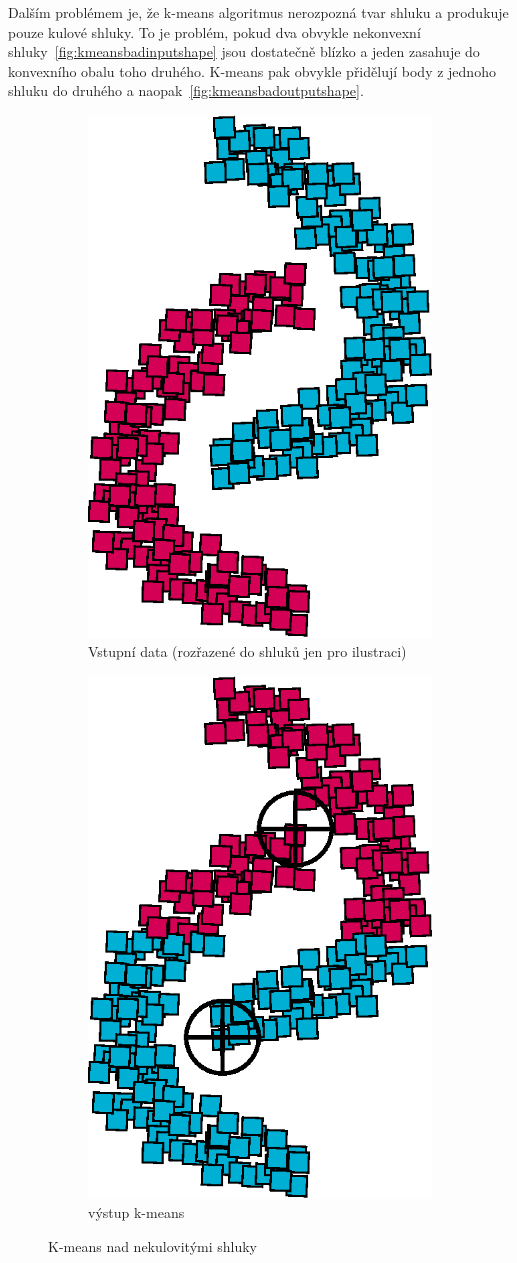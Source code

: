Dalším problémem je, že k-means algoritmus nerozpozná tvar shluku a produkuje pouze kulové shluky. To je problém, pokud dva obvykle nekonvexní shluky~\autoref{fig:kmeansbadinputshape} jsou dostatečně blízko a jeden zasahuje do konvexního obalu toho druhého. K-means pak obvykle přidělují body z jednoho shluku do druhého a naopak~\autoref{fig:kmeansbadoutputshape}.\\
\begin{figure}[h]
\begin{subfigure}{.49\textwidth}
  \centering
  \includegraphics[width=.5\linewidth]{img/kmeans_badInputSampleShape.eps}
  \caption{Vstupní data (rozřazené do shluků jen pro ilustraci)}
  \label{fig:kmeansbadinputshape}
\end{subfigure}
\begin{subfigure}{.49\textwidth}
  \centering
  \includegraphics[width=.5\linewidth]{img/kmeans_badOutputSampleShape.eps}
  \caption{výstup k-means}
  \label{fig:kmeansbadoutputshape}
\end{subfigure}
\caption{K-means nad nekulovitými shluky}
\end{figure}

